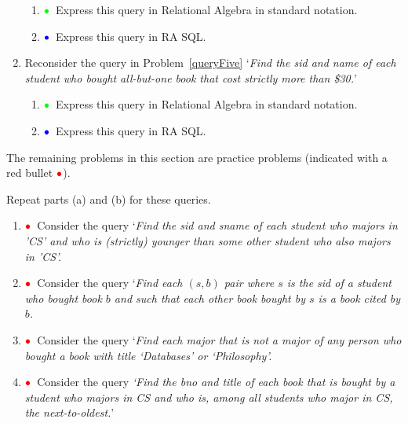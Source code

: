 \documentclass[11pt]{article}
\newcommand{\red}[1]{{\color{red}#1}}
\newcommand{\green}[1]{{\color{green}#1}}
\newcommand{\blue}[1]{{\color{blue}#1}}
\newcommand{\redbullet}{$\red{\bullet}$}
\newcommand{\greenbullet}{$\green{\bullet}$}
\newcommand{\bluebullet}{$\blue{\bullet}$}
\begin{document}
\begin{enumerate}[resume]
\begin{enumerate}
     \item  \greenbullet\  Express this query in Relational Algebra in standard notation.
     

     \item  \bluebullet\  Express this query in RA SQL.
     \end{enumerate}

\item Reconsider the query in Problem~\ref{queryFive}
`\emph{Find the sid and name of each student who bought all-but-one book that cost strictly more than \$30.}'

     \begin{enumerate}
    
     \item  \greenbullet\  Express this query in Relational Algebra in standard notation.
    

    
     \item  \bluebullet\  Express this query in RA SQL.
     \end{enumerate}


\end{enumerate}

\newpage
The remaining problems in this section are practice problems (indicated with a red bullet \redbullet).

Repeat parts (a) and (b) for these queries.

\begin{enumerate}[resume]
\item \redbullet\  Consider the query `\emph{Find the sid and sname of each student who majors in 'CS' and who is (strictly) younger than some other student who also majors in 'CS'.}

\item \redbullet\  Consider the query
`\emph{Find each $(s,b)$ pair where $s$ is the                                                     
sid of a student who bought book $b$ and such that                                                               
each other book bought by $s$ is a book cited by $b$.}

\item \redbullet\  Consider the query
`\emph{Find each major that is not a major of any person who bought a book with title `Databases' or `Philosophy'.}


\item \redbullet\  Consider the query \emph{`Find the bno and title of
each book that is bought by a student who majors in CS and who is,
among all students who major in CS, 
the next-to-oldest.}'   


\end{enumerate}
\end{document}

